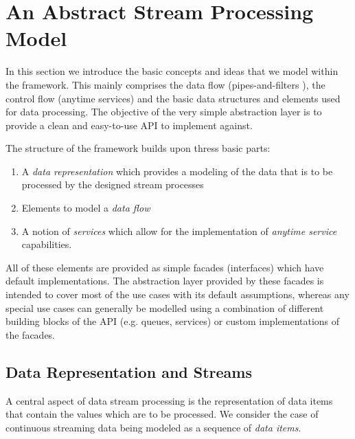 \section{\label{sec:abstraction}An Abstract Stream Processing Model}
In this section we introduce the basic concepts and ideas that we
model within the \streams framework. This mainly comprises the data
flow (pipes-and-filters \cite{softwarePatterns}), the control flow
(anytime services) and the basic data structures and elements used for
data processing. The objective of the very simple abstraction layer is
to provide a clean and easy-to-use API to implement against. 

The structure of the \streams framework builds upon thress basic parts:
\begin{enumerate}
\item A {\em data representation} which provides a modeling of the
  data that is to be processed by the designed stream processes
\item Elements to model a {\em data flow}
\item A notion of {\em services} which allow for the implementation
  of {\em anytime service} capabilities.
\end{enumerate}
All of these elements are provided as simple facades (interfaces)
which have default implementations. The abstraction layer provided by
these facades is intended to cover most of the use cases with its
default assumptions, whereas any special use cases can generally be
modelled using a combination of different building blocks of the API
(e.g. queues, services) or custom implementations of the facades.

\subsection{\label{sec:data}Data Representation and Streams}
A central aspect of data stream processing is the representation of
data items that contain the values which are to be processed.  We
consider the case of continuous streaming data being modeled as a
sequence of {\em data items}. 

